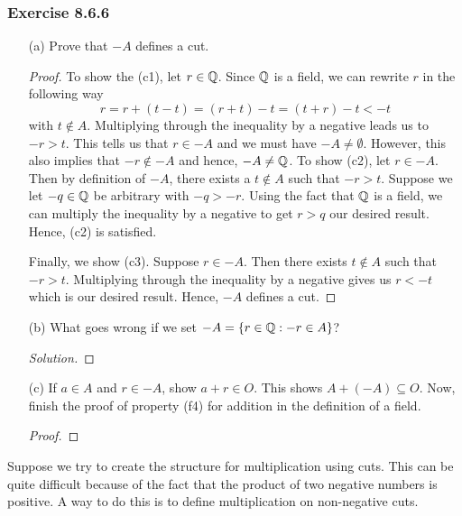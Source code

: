 \subsubsection{Exercise 8.6.6} 
\begin{enumerate}
    \item[(a)] Prove that \( -A  \) defines a cut.
        \begin{proof}
        To show the (c1), let \( r \in \mathbb{Q}  \). Since \( \mathbb{Q}  \) is a field, we can rewrite \( r  \) in the following way
        \[  r = r + (t - t)  = (r+t) - t = (t+r) - t < -t  \] with \( t \not\in A  \). Multiplying through the inequality by a negative leads us to \(  -r > t  \). This tells us that \( r \in -A  \) and we must have \( -A \neq \emptyset  \). However, this also implies that \( -r \notin -A  \) and hence, \( -A \neq \mathbb{Q}  \).
        To show (c2), let \( r \in -A  \). Then by definition of \( -A  \), there exists a \( t \notin A  \) such that \( -r  > t  \). Suppose we let \( -q \in \mathbb{Q}  \) be arbitrary with \( -q > -r  \). Using the fact that \( \mathbb{Q}  \) is a field, we can multiply the inequality by a negative to get \( r > q  \) our desired result. Hence, (c2) is satisfied.

        Finally, we show (c3). Suppose \( r \in -A  \). Then there exists \( t \notin A  \) such that \( -r > t  \). Multiplying through the inequality by a negative gives us \( r < -t  \) which is our desired result. Hence, \( -A  \) defines a cut.
        \end{proof}
    \item[(b)] What goes wrong if we set \( -A = \{ r \in \mathbb{Q} : -r \in A  \}  \)?
        \begin{proof}[Solution]
        
        \end{proof}
    \item[(c)] If \( a \in A  \) and \( r \in -A  \), show \( a + r \in O  \). This shows \( A + (-A ) \subseteq O  \). Now, finish the proof of property (f4) for addition in the definition of a field.
        \begin{proof}

        \end{proof}
\end{enumerate}

Suppose we try to create the structure for multiplication using cuts. This can be quite difficult because of the fact that the product of two negative numbers is positive. A way to do this is to define multiplication on non-negative cuts.


